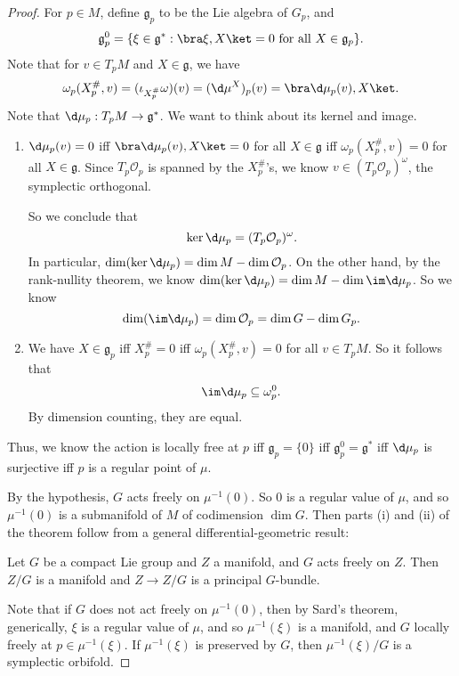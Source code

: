 \documentclass[a4paper]{article}
\begin{document}
\begin{proof}
  For $p \in M$, define $\mathfrak{g}_p$ to be the Lie algebra of $G_p$, and
  \[
    \mathfrak{g}_p^0 = \{\xi \in \mathfrak{g}^*: \bra \xi, X \ket = 0\text{ for all }X \in \mathfrak{g}_p\}.
  \]
  Note that for $v \in T_p M$ and $X \in \mathfrak{g}$, we have
  \[
    \omega_p(X_p^\#, v) = (\iota_{X_p^\#} \omega) (v) = (\d \mu^X)_p (v) = \bra \d \mu_p(v), X\ket.
  \]
  Note that $\d \mu_p: T_p M \to \mathfrak{g}^*$. We want to think about its kernel and image.
  \begin{enumerate}
    \item $\d \mu_p(v) = 0$ iff $\bra \d \mu_p(v), X\ket = 0$ for all $X \in \mathfrak{g}$ iff $\omega_p(X_p^\#, v) = 0$ for all $X \in \mathfrak{g}$. Since $T_p \mathcal{O}_p$ is spanned by the $X_p^\#$'s, we know $v \in (T_p \mathcal{O}_p)^{\omega}$, the symplectic orthogonal.

    So we conclude that
    \[
      \ker \d \mu_p = (T_p \mathcal{O}_p)^\omega.
    \]
    In particular, $\dim (\ker \d \mu_p) = \dim M - \dim \mathcal{O}_p$. On the other hand, by the rank-nullity theorem, we know $\dim (\ker \d \mu_p) = \dim M - \dim \im \d \mu_p$. So we know
    \[
      \dim (\im \d \mu_p) = \dim \mathcal{O}_p = \dim G - \dim G_p.
    \]
  \item We have $X \in \mathfrak{g}_p$ iff $X_p^\# = 0$ iff $\omega_p(X_p^\#, v) = 0$ for all $v \in T_p M$. So it follows that
    \[
      \im \d \mu_p \subseteq \omega_p^0.
    \]
    By dimension counting, they are equal.
  \end{enumerate}
  Thus, we know the action is locally free at $p$ iff $\mathfrak{g}_p = \{0\}$ iff $\mathfrak{g}_p^0 = \mathfrak{g}^*$ iff $\d \mu_p$ is surjective iff $p$ is a regular point of $\mu$.

  By the hypothesis, $G$ acts freely on $\mu^{-1}(0)$. So $0$ is a regular value of $\mu$, and so $\mu^{-1}(0)$ is a submanifold of $M$ of codimension $\dim G$. Then parts (i) and (ii) of the theorem follow from a general differential-geometric result:
  \begin{thm}
    Let $G$ be a compact Lie group and $Z$ a manifold, and $G$ acts freely on $Z$. Then $Z/G$ is a manifold and $Z \to Z/G$ is a principal $G$-bundle.
  \end{thm}
  Note that if $G$ does not act freely on $\mu^{-1}(0)$, then by Sard's theorem, generically, $\xi$ is a regular value of $\mu$, and so $\mu^{-1}(\xi)$ is a manifold, and $G$ locally freely at $p \in \mu^{-1}(\xi)$. If $\mu^{-1}(\xi)$ is preserved by $G$, then $\mu^{-1}(\xi)/G$ is a symplectic orbifold.


\end{proof}
\end{document}
